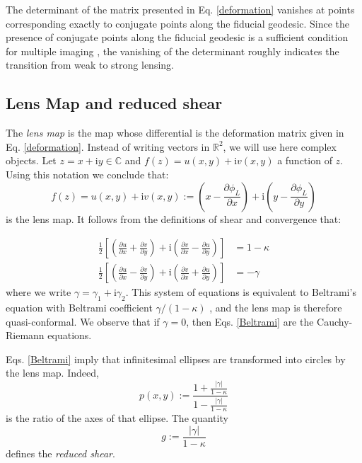 \documentclass[twocolumn,aps,reprint, nofootinbib]{revtex4}
\newcommand{\ii}{{\mathrm{i}}}
\begin{document}
The determinant of the matrix presented in Eq. \eqref{deformation} vanishes at points corresponding exactly to conjugate points along the fiducial geodesic. Since the presence of conjugate points along the fiducial geodesic is a sufficient condition for multiple imaging \cite{perlick1996criteria}, the vanishing of the determinant roughly indicates the transition from weak to strong lensing. 

\subsection{Lens Map and reduced shear}
\label{reduced_shear_app}

The \emph{lens map} is the map whose differential is the deformation matrix given in Eq. \eqref{deformation}. Instead of writing vectors in $\mathbb{R}^2$, we will use here complex objects. Let $z = x + \ii y \in \mathbb{C}$ and $f(z) = u(x, y) + \ii v(x, y)$ a function of $z$. Using this notation we conclude that:
\begin{equation}
f(z) = u(x, y) + \ii v(x, y) := \left( x - \frac{\partial \phi_L}{\partial x} \right) + \ii \left( y - \frac{\partial \phi_L}{\partial y} \right)
\end{equation}
is the lens map. It follows from the definitions of shear and convergence that:

\begin{subequations}
\label{Beltrami}
\begin{align}
\frac{1}{2} \left[ \left( \frac{\partial u}{\partial x} + \frac{\partial v}{\partial y} \right) + \ii \left( \frac{\partial v}{\partial x} - \frac{\partial u}{\partial y} \right) \right] & =   1 - \kappa \\
\frac{1}{2} \left[ \left( \frac{\partial u}{\partial x} - \frac{\partial v}{\partial y} \right) + \ii \left( \frac{\partial v}{\partial x} + \frac{\partial u}{\partial y} \right) \right] & =   - \gamma
\end{align}
\end{subequations}
where we write $\gamma = \gamma_1 + \ii \gamma_2$. This system of equations is equivalent to Beltrami's equation with Beltrami coefficient $\gamma/(1-\kappa)$ \cite{beltrami_paper}, and the lens map is therefore quasi-conformal. We observe that if $\gamma=0$, then Eqs. \eqref{Beltrami} are the Cauchy-Riemann equations. 

Eqs. \eqref{Beltrami} imply that infinitesimal ellipses are transformed into circles by the lens map. Indeed, 
\begin{equation}
p(x, y) := \frac{1 + \frac{|\gamma|}{1-\kappa}}{1 - \frac{|\gamma|}{1-\kappa}}
\end{equation}
is the ratio of the axes of that ellipse. The quantity 
\begin{equation}
g := \frac{|\gamma|}{1-\kappa}
\end{equation}
defines the \emph{reduced shear}.
\end{document}
